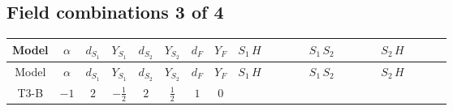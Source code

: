 \documentclass[8pt]{article}
\begin{document}
\begin{landscape}
\subsection*{Field combinations 3 of 4}
\begin{longtable}{@{}cccccccc >{\raggedright\arraybackslash}p{0.21\linewidth} >{\raggedright\arraybackslash}p{0.21\linewidth} >{\raggedright\arraybackslash}p{0.21\linewidth}@{}}
\toprule
Model & $\alpha$ & $d_{S_1}$ & $Y_{S_1}$ & $d_{S_2}$ & $Y_{S_2}$ & $d_F$ & $Y_F$ & $S_1\,H$ & $S_1\,S_2$ & $S_2\,H$ \\
\midrule
\endfirsthead
\toprule
Model & $\alpha$ & $d_{S_1}$ & $Y_{S_1}$ & $d_{S_2}$ & $Y_{S_2}$ & $d_F$ & $Y_F$ & $S_1\,H$ & $S_1\,S_2$ & $S_2\,H$ \\
\midrule
\endhead
T3-B & $-1$ & $2$ & $-\frac{1}{2}$ & $2$ & $\frac{1}{2}$ & $1$ & $0$ & \scriptsize\adjustbox{max width=\linewidth}{$\begin{gathered} +H_{a_2} S_{1,j_2} H_{a_1}{}^{\dagger } S_{1,j_1}{}^{\dagger } \mathcal{I}_{H1,a_1,a_2,j_1,j_2}{}^1 \lambda_{HS_1}^{(1)}^{(1)} \\ +H_{a_2} S_{1,j_2} H_{a_1}{}^{\dagger } S_{1,j_1}{}^{\dagger } \mathcal{I}_{H1,a_1,a_2,j_1,j_2}{}^2 \lambda_{HS_1}^{(1)}^{(2)}\end{gathered}$} & \scriptsize\adjustbox{max width=\linewidth}{$\begin{gathered} +S_{1,j_3} S_{2,j_4} S_{1,j_1}{}^{\dagger } S_{2,j_2}{}^{\dagger } \mathcal{I}_{12,j_1,j_3,j_2,j_4}{}^1 \lambda_{12}^{(1)}^{(1)} \\ +S_{1,j_3} S_{2,j_4} S_{1,j_1}{}^{\dagger } S_{2,j_2}{}^{\dagger } \mathcal{I}_{12,j_1,j_3,j_2,j_4}{}^2 \lambda_{12}^{(1)}^{(2)}\end{gathered}$} & \scriptsize\adjustbox{max width=\linewidth}{$\begin{gathered} +H_{a_2} S_{2,j_2} H_{a_1}{}^{\dagger } S_{2,j_1}{}^{\dagger } \mathcal{I}_{H2,a_1,a_2,j_1,j_2}{}^1 \lambda_{HS_2}^{(1)}^{(1)} \\ +H_{a_2} S_{2,j_2} H_{a_1}{}^{\dagger } S_{2,j_1}{}^{\dagger } \mathcal{I}_{H2,a_1,a_2,j_1,j_2}{}^2 \lambda_{HS_2}^{(1)}^{(2)}\end{gathered}$} \\
\midrule

\end{longtable}
\end{landscape}
\end{document}
